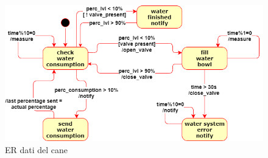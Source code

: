      \begin{figure}[H]
        \caption{ER dati del cane}
        \label{fig:dogER}
        \centering
        \includegraphics[width=1\textwidth]{DrawIo/stateDiagramWater.png}
    \end{figure}